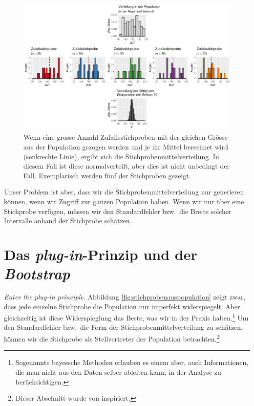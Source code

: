 \documentclass[oneside, 10pt]{book}\usepackage[]{graphicx}\usepackage[]{xcolor}
\newenvironment{knitrout}{}{} %
\begin{document}
\begin{knitrout}
\color{fgcolor}\begin{figure}[tp]

{\centering \includegraphics[width=\textwidth]{figs/unnamed-chunk-141-1} 

}

\caption{Wenn eine grosse Anzahl Zufallsstichproben mit der gleichen Grösse aus der Population gezogen werden und je ihr Mittel berechnet wird (senkrechte Linie), ergibt sich die Stichprobenmittelverteilung. In diesem Fall ist diese normalverteilt, aber dies ist nicht unbedingt der Fall. Exemplarisch werden fünf der Stichproben gezeigt.\label{fig:stichprobenauspopulation}}\label{fig:unnamed-chunk-141}
\end{figure}

\end{knitrout}

Unser Problem ist aber, dass wir die Stichprobenmittelverteilung
nur generieren können, wenn wir Zugriff zur ganzen Population haben.
Wenn wir nur über eine Stichprobe verfügen, müssen wir den
Standardfehler bzw.\ die Breite solcher Intervalle anhand der
Stichprobe schätzen.

\section{Das \textit{plug-in}-Prinzip und der \textit{Bootstrap}}
\emph{Enter the plug-in principle.}
Abbildung \ref{fig:stichprobenauspopulation} zeigt zwar,
dass jede einzelne Stichprobe die Population nur imperfekt
widerspiegelt. Aber gleichzeitig ist diese Widerspieglung
das Beste, was wir in der Praxis haben.\footnote{Sogenannte bayessche
Methoden erlauben es einem aber, auch Informationen, die man nicht
aus den Daten selber ableiten kann, in der Analyse zu berücksichtigen.}
Um den Standardfehler bzw.\ die
Form der Stichprobenmittelverteilung zu schätzen, können wir
die Stichprobe als Stellvertreter der Population
betrachten.\footnote{Dieser Abschnitt wurde von \citet{Hesterberg2015} inspiriert.}
\end{document}
